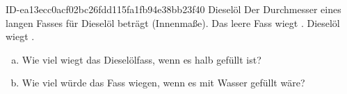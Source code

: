 \begin{exercise}
      {ID-ea13ecc0acf02bc26fdd115fa1fb94e38bb23f40}
      {Dieselöl}
  \ifproblem\problem
    Der Durchmesser eines  langen Fasses für Dieselöl
    beträgt  (Innenmaße). Das leere Fass wiegt .
     Dieselöl wiegt .
    \begin{enumerate}[a)]
      \item Wie viel wiegt das Dieselölfass, wenn es halb gefüllt ist?
      \item Wie viel würde das Fass wiegen, wenn es mit Wasser gefüllt wäre?
    \end{enumerate}
  \fi
\end{exercise}
